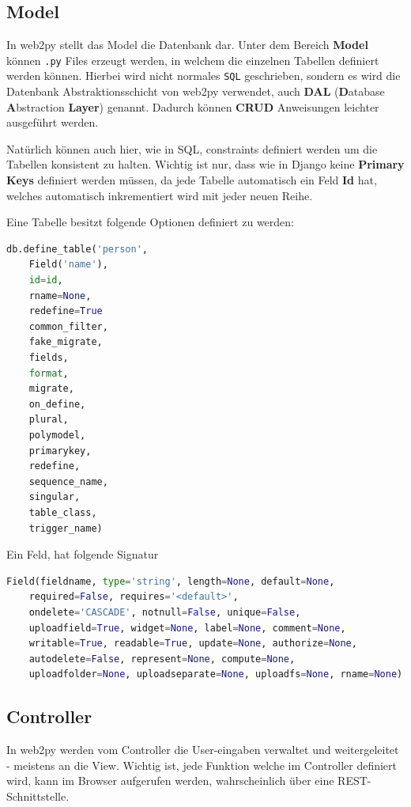 \subsection{Model}
In web2py stellt das Model die Datenbank dar. Unter dem Bereich \textbf{Model} können \verb|.py| Files erzeugt werden, in welchem die einzelnen Tabellen definiert werden können. Hierbei wird nicht normales \verb|SQL| geschrieben, sondern es wird die Datenbank Abstraktionsschicht von web2py verwendet, auch \textbf{DAL} (\textbf{D}atabase \textbf{A}bstraction \textbf{Layer}) genannt. Dadurch können \textbf{CRUD} Anweisungen leichter ausgeführt werden.

Natürlich können auch hier, wie in SQL, constraints definiert werden um die Tabellen konsistent zu halten. Wichtig ist nur, dass wie in Django keine \textbf{Primary Keys} definiert werden müssen, da jede Tabelle automatisch ein Feld \textbf{Id} hat, welches automatisch inkrementiert wird mit jeder neuen Reihe. 

Eine Tabelle besitzt folgende Optionen definiert zu werden: 

\begin{lstlisting}[language=python]
db.define_table('person',
	Field('name'),
	id=id,
	rname=None,
	redefine=True
	common_filter,
	fake_migrate,
	fields,
	format,
	migrate,
	on_define,
	plural,
	polymodel,
	primarykey,
	redefine,
	sequence_name,
	singular,
	table_class,
	trigger_name)

\end{lstlisting}

Ein Feld, hat folgende Signatur
\begin{lstlisting}[language=python]
Field(fieldname, type='string', length=None, default=None,
	required=False, requires='<default>',
	ondelete='CASCADE', notnull=False, unique=False,
	uploadfield=True, widget=None, label=None, comment=None,
	writable=True, readable=True, update=None, authorize=None,
	autodelete=False, represent=None, compute=None,
	uploadfolder=None, uploadseparate=None, uploadfs=None, rname=None)
\end{lstlisting}

\clearpage
\subsection{Controller}
In web2py werden vom Controller die User-eingaben verwaltet und weitergeleitet - meistens an die View. Wichtig ist, jede Funktion welche im Controller definiert wird, kann im Browser aufgerufen werden, wahrscheinlich über eine REST-Schnittstelle.

